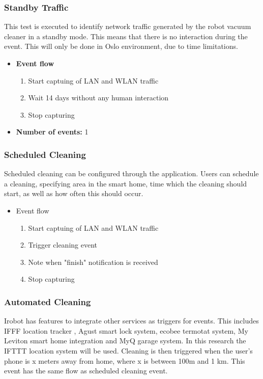 \subsubsection{Standby Traffic}
This test is executed to identify network traffic generated by the robot vacuum cleaner in a standby mode. This means that there is no interaction during the event. This will only be done in Oslo environment, due to time limitations.

\begin{itemize}
    \item \textbf{Event flow} \begin{enumerate}
                                    \item Start captuing of LAN and WLAN traffic
                                    \item Wait 14 days without any human interaction
                                    \item Stop capturing
                                \end{enumerate}
    \item \textbf{Number of events:} 1
\end{itemize}

\subsubsection{Scheduled Cleaning}
Scheduled cleaning can be configured through the application. Users can schedule a cleaning, specifying area in the smart home, time which the cleaning should start, as well as how often this should occur. 
\begin{itemize}
    \item Event flow \begin{enumerate}
                                    \item Start captuing of LAN and WLAN traffic
                                    \item Trigger cleaning event
                                    \item Note when "finish" notification is received
                                    \item Stop capturing
                                \end{enumerate}
\end{itemize}

\subsubsection{Automated Cleaning}
Irobot has features to integrate other services as triggers for events. This includes IFFF location tracker \cite{}, Agust smart lock system, ecobee termotat system, My Leviton smart home integration and MyQ garage system. In this research the IFTTT location system will be used. Cleaning is then triggered when the user's phone is x meters away from home, where x is between 100m and 1 km. This event has the same flow as scheduled cleaning event. 


